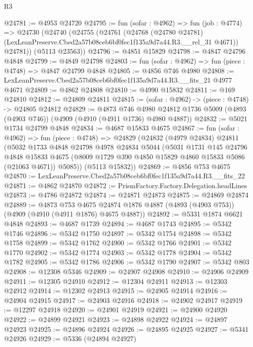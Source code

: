 \begin{lexlean}{R3}
\begin{coremodule}
@24781 := @4953 @24720
@24795 := fun (sofar : @4962) =>
  fun (job : @4774) =>
  @24730
    (@24740
      (@24755
        (@24761
          (@24768
            (@24780 @24781)
            (LexLeanPreserve.Cbed2a57b08ceb6bf0fec1f135a9d7a44.R3.__rel_31 @4671))
          @24781))
      (@5113 @23563))
@24796 := @4851 @15829
@24798 := @4847 @24796 @4848
@24799 := @4849 @24798
@24803 := fun (sofar : @4962) => fun (piece : @4748) => @4847 @24799 @4848
@24805 := @4856 @746 @4980
@24808 := LexLeanPreserve.Cbed2a57b08ceb6bf0fec1f135a9d7a44.R3.__fits_21 @4977 @4671
@24809 := @4862 @24808
@24810 := @4990 @15832
@24811 := @169 @24810
@24812 := @24809 @24811
@24815 := (sofar : @4962) -> (piece : @4748) -> @24805 @24812
@24829 := @4873
    @746
    @4980
    @24812
    @1736
    @5009
    (@4893 (@4903 @746))
    (@4909 (@4910 (@4911 @1736) @4980 @4887))
@24832 := @5021 @1734 @24799 @4848
@24834 := @4687 @15833 @4675
@24867 := fun (sofar : @4962) =>
  fun (piece : @4748) =>
  @24829
    (@24832
      (@4979 @24834)
      @24811
      (@5032
        @1733
        @4848
        @24798
        @4978
        @24834
        @5044
        (@5031
          @1731
          @145
          @24796
          @4848
          @15833
          @4675
          (@8009 @1729 @390 @4850 @15829 @4860 @15833 @5086 (@21063 @4671))
          @5085))
      (@5113 @15832))
@24869 := @4856 @753 @4675
@24870 := LexLeanPreserve.Cbed2a57b08ceb6bf0fec1f135a9d7a44.R3.__fits_22
@24871 := @4862 @24870
@24872 := PrismFactory.Factory.Delegation.headLines
@24873 := @4786 @24872
@24874 := @24871 @24873
@24875 := @24869 @24874
@24889 := @4873
    @753
    @4675
    @24874
    @1876
    @4887
    (@4893 (@4903 @753))
    (@4909 (@4910 (@4911 @1876) @4675 @4887))
@24892 := @5331 @1874 @6621 @4848
@24893 := @4687 @1739
@24894 := @4687 @1743
@24895 := @5342 @1746
@24896 := @5342 @1750
@24897 := @5342 @1754
@24898 := @5342 @1758
@24899 := @5342 @1762
@24900 := @5342 @1766
@24901 := @5342 @1770
@24902 := @5342 @1774
@24903 := @5342 @1778
@24904 := @5342 @1782
@24905 := @5342 @1786
@24906 := @5342 @1790
@24907 := @5342 @803
@24908 := @12308 @5346
@24909 := @24907 @24908
@24910 := @24906 @24909
@24911 := @12305 @24910
@24912 := @12304 @24911
@24913 := @12303 @24912
@24914 := @12302 @24913
@24915 := @24905 @24914
@24916 := @24904 @24915
@24917 := @24903 @24916
@24918 := @24902 @24917
@24919 := @12297 @24918
@24920 := @24901 @24919
@24921 := @24900 @24920
@24922 := @24899 @24921
@24923 := @24898 @24922
@24924 := @24897 @24923
@24925 := @24896 @24924
@24926 := @24895 @24925
@24927 := @5341 @24926
@24929 := @5336 (@24894 @24927)

\end{coremodule}
\end{lexlean}
